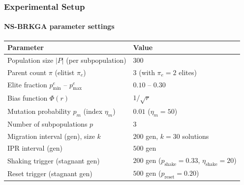 \documentclass[
	11pt, %
	aspectratio=169, %
]{beamer}
\begin{document}
\begin{frame}
\frametitle{Experimental Setup}
\framesubtitle{\textsc{NS-BRKGA} parameter settings}

\begin{table}[!htbp]
\centering
\begin{tabular}{ll}
\toprule
\textbf{Parameter}                              & \textbf{Value}                                                    \\
\midrule
Population size $|P|$ (per subpopulation)       & $300$                                                             \\
Parent count $\pi$ (elitist $\pi_e$)            & $3$ (with $\pi_e = 2$ elites)                                     \\
Elite fraction $p^{e}_{\min}$ -- $p^{e}_{\max}$ & $0.10$ -- $0.30$                                                  \\
Bias function $\Phi(r)$                         & $1/\sqrt{r}$                                                      \\
Mutation probability $p_{m}$ (index $\eta_{m}$) & $0.01$ ($\eta_{m} = 50$)                                          \\
Number of subpopulations $p$                    & $3$                                                               \\
Migration interval (gen), size $k$              & $200$ gen, $k = 30$ solutions                                     \\
IPR interval (gen)                              & $500$ gen                                                         \\
Shaking trigger (stagnant gen)                  & $200$ gen ($p_{\text{shake}} = 0.33$, $\eta_{\text{shake}} = 20$) \\
Reset trigger (stagnant gen)                    & $500$ gen ($p_{\text{reset}} = 0.20$)                             \\
\bottomrule
\end{tabular}
\label{tab:nsbrkga_params}
\end{table}

\end{frame}
\end{document}
